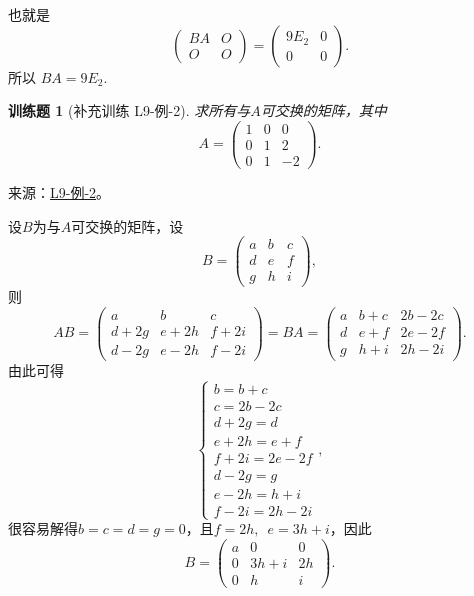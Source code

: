 \documentclass[12pt,fontset=fandol]{ctexart}
\newtheorem{exercise}{训练题}[section]
\begin{document}
\begin{solve}
            也就是 \[\begin{pmatrix}BA & O \\ O & O\end{pmatrix}=\begin{pmatrix}9E_2 & 0 \\ 0 & 0\end{pmatrix}.\]
            所以 $BA=9E_2$.
\end{solve}

\begin{exercise}[补充训练 L9-例-2]\label{prob:L9-例-2}
求所有与$A$可交换的矩阵，其中
    \[A=\begin{pmatrix}
            1 & 0 & 0  \\
            0 & 1 & 2  \\
            0 & 1 & -2
        \end{pmatrix}.\]
\end{exercise}
\noindent 来源：\href{https://github.com/yhwu-is/Linear-Algebra-Left-Undone/blob/new/%E8%AE%B2%E4%B9%89/%E4%B8%93%E9%A2%98/9%20%E7%9F%A9%E9%98%B5%E8%BF%90%E7%AE%97%E8%BF%9B%E9%98%B6.tex}{L9-例-2}。
\begin{solve}
设$B$为与$A$可交换的矩阵，设
    \[B=\begin{pmatrix}
            a & b & c \\
            d & e & f \\
            g & h & i
        \end{pmatrix},\]
    则
    \[AB=\begin{pmatrix}
            a    & b    & c    \\
            d+2g & e+2h & f+2i \\
            d-2g & e-2h & f-2i
        \end{pmatrix}=BA=\begin{pmatrix}
            a & b+c & 2b-2c \\
            d & e+f & 2e-2f \\
            g & h+i & 2h-2i
        \end{pmatrix}.\]
    由此可得
    \[\begin{cases}
            b=b+c      \\
            c=2b-2c    \\
            d+2g=d     \\
            e+2h=e+f   \\
            f+2i=2e-2f \\
            d-2g=g     \\
            e-2h=h+i   \\
            f-2i=2h-2i
        \end{cases},\]
    很容易解得$b=c=d=g=0$，且$f=2h,\enspace e=3h+i$，因此
    \[B=\begin{pmatrix}
            a & 0    & 0  \\
            0 & 3h+i & 2h \\
            0 & h    & i
        \end{pmatrix}.\]
\end{solve}
\end{document}
